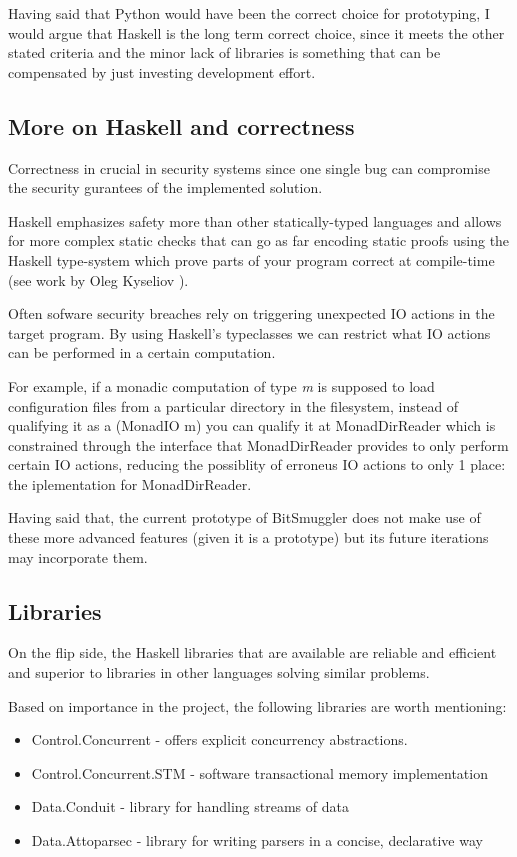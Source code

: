 \documentclass[11pt]{book} %
\newcommand{\projectName}{BitSmuggler }
\begin{document}
Having said that Python would have been the correct choice for prototyping, I would argue that Haskell is the long term correct choice, since it meets the other stated criteria and the minor lack of libraries is something that can be compensated by just investing development effort.

\subsection{More on Haskell and correctness}

Correctness in crucial in security systems since one single bug can compromise the security gurantees of the implemented solution.

Haskell emphasizes safety more than other statically-typed languages and allows for more complex static checks that can go as far encoding static proofs using the Haskell type-system which prove parts of your program correct at compile-time (see work by Oleg Kyseliov \citep*{olegArrays}).

Often sofware security breaches rely on triggering unexpected IO actions in the target program. By using Haskell's typeclasses we can restrict what IO actions can be performed in a certain computation.

For example, if a monadic computation of type \textit{m} is supposed to load configuration files from a particular directory in the filesystem, instead of qualifying it as a (MonadIO m) you can qualify it at MonadDirReader which is constrained through the interface that MonadDirReader provides to only perform certain IO actions, reducing the possiblity of erroneus IO actions to only 1 place: the iplementation for MonadDirReader.

Having said that, the current prototype of \projectName does not make use of these more advanced features (given it is a prototype) but its future iterations may incorporate them.

\subsection{Libraries}

On the flip side, the Haskell libraries that are available are reliable and efficient and superior to libraries in other languages solving similar problems.

Based on importance in the project, the following libraries are worth mentioning:

\begin{itemize}
\item  Control.Concurrent - offers explicit concurrency abstractions. 
\item Control.Concurrent.STM - software transactional memory implementation
\item Data.Conduit -  library for handling streams of data
\item Data.Attoparsec - library for writing parsers in a concise, declarative way
\end{itemize}
\end{document}
